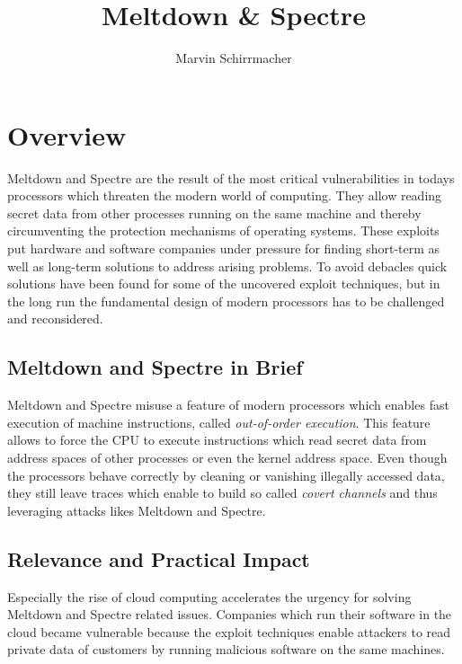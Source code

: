 \documentclass[a4paper,oneside,openright] {scrreprt}
\title{\Huge Meltdown \& Spectre}
\author{\Large Marvin Schirrmacher}
\begin{document}


\pagestyle{plain}
\cleardoublepage
{}
\tableofcontents
\clearpage
{}


\chapter{Overview}  
\label{ch:overview}

Meltdown and Spectre are the result of the most critical vulnerabilities in todays processors 
which threaten the modern world of computing. They allow reading secret data from other processes running on
the same machine and thereby circumventing the protection mechanisms of operating systems.
These exploits put hardware and software companies under pressure for finding short-term as well
as long-term solutions to address arising problems. To avoid debacles quick solutions have been found 
for some of the uncovered exploit techniques, but in the long run the fundamental design of modern 
processors has to be challenged and reconsidered.

\section{Meltdown and Spectre in Brief}
\label{ch:intro:motivation}

Meltdown and Spectre misuse a feature of modern processors which enables fast execution of machine instructions, 
called \textit{out-of-order execution}. This feature allows to force the CPU to execute instructions 
which read secret data from address spaces of other processes or even the kernel address space. 
Even though the processors behave correctly by cleaning or vanishing illegally accessed data, 
they still leave traces which enable to build so called \textit{covert channels} 
and thus leveraging attacks likes Meltdown and Spectre.

\section{Relevance and Practical Impact}
\label{ch:intro:motivation}

Especially the rise of cloud computing accelerates the urgency for solving Meltdown and Spectre related issues.
Companies which run their software in the cloud became vulnerable because the exploit techniques enable attackers
to read private data of customers by running malicious software on the same machines. 
\end{document}
